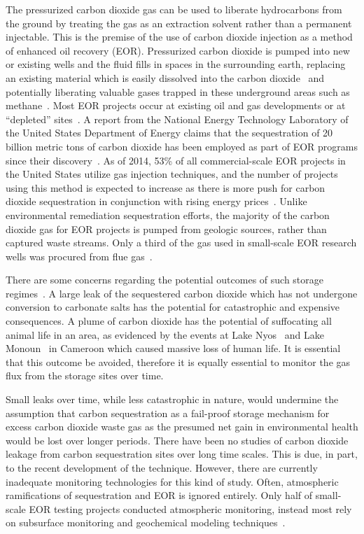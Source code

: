 \documentclass[journal]{IEEEtran}
\begin{document}
The pressurized carbon dioxide gas can be used to liberate hydrocarbons from the ground by treating the gas as an extraction solvent rather than a permanent injectable.  This is the premise of the use of carbon dioxide injection as a method of enhanced oil recovery (EOR).  Pressurized carbon dioxide is pumped into new or existing wells and the fluid fills in spaces in the surrounding earth, replacing an existing material which is easily dissolved into the carbon dioxide~\cite{chadwick_latest_2009} and potentially liberating valuable gases trapped in these underground areas such as methane~\cite{white_sequestration_2005}.  Most EOR projects occur at existing oil and gas developments or at ``depleted'' sites~\cite{cook_what_2014}.  A report from the National Energy Technology Laboratory of the United States Department of Energy claims that the sequestration of 20 billion metric tons of carbon dioxide has been employed as part of EOR programs since their discovery~\cite{kuuskraa_improving_2011, kuuskraa_co2_2013}.  As of 2014, 53\% of all commercial-scale EOR projects in the United States utilize gas injection techniques, and the number of projects using this method is expected to increase as there is more push for carbon dioxide sequestration in conjunction with rising energy prices~\cite{manrique_eor_2006}. Unlike environmental remediation sequestration efforts, the majority of the carbon dioxide gas for EOR projects is pumped from geologic sources, rather than captured waste streams.  Only a third of the gas used in small-scale EOR research wells was procured from flue gas~\cite{cook_what_2014}.

There are some concerns regarding the potential outcomes of such storage regimes~\cite{kharaka_potential_2009}.  A large leak of the sequestered carbon dioxide which has not undergone conversion to carbonate salts has the potential for catastrophic and expensive consequences.  A plume of carbon dioxide has the potential of suffocating all animal life in an area, as evidenced by the events at Lake Nyos~\cite{kling_1986_1987} and Lake Monoun~\cite{sigurdsson_origin_1987} in Cameroon which caused massive loss of human life.  It is essential that this outcome be avoided, therefore it is equally essential to monitor the gas flux from the storage sites over time.  

Small leaks over time, while less catastrophic in nature, would undermine the assumption that carbon sequestration as a fail-proof storage mechanism for excess carbon dioxide waste gas as the presumed net gain in environmental health would be lost over longer periods.  There have been no studies of carbon dioxide leakage from carbon sequestration sites over long time scales.  This is due, in part, to the recent development of the technique.  However, there are currently inadequate monitoring technologies for this kind of study.  Often, atmospheric ramifications of sequestration and EOR is ignored entirely.  Only half of small-scale EOR testing projects conducted atmospheric monitoring, instead most rely on subsurface monitoring and geochemical modeling techniques~\cite{cook_what_2014}.
\end{document}
